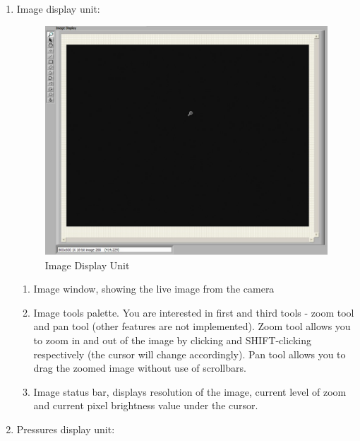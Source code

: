 \documentclass[a4paper,12pt]{article}
\begin{document}
\begin{enumerate}
	
	\item Image display unit:
	
	\begin{figure}[htbp]
		\centering
			\includegraphics[width=1.00\textwidth]{figs/labvamp_imgdisplay.pdf}
		\caption{Image Display Unit}
		\label{fig:LabVAMP_imgdisplay}
	\end{figure}
	
	\begin{enumerate}
		\item Image window, showing the live image from the camera
		\item Image tools palette. You are interested in first and third tools - zoom tool and pan tool (other features are not implemented). Zoom tool allows you to zoom in and out of the image by clicking and SHIFT-clicking respectively (the cursor will change accordingly). Pan tool allows you to drag the zoomed image without use of scrollbars.
		\item Image status bar, displays resolution of the image, current level of zoom and current pixel brightness value under the cursor.
	\end{enumerate}
	
	\item Pressures display unit:
	

\end{enumerate}
\end{document}

